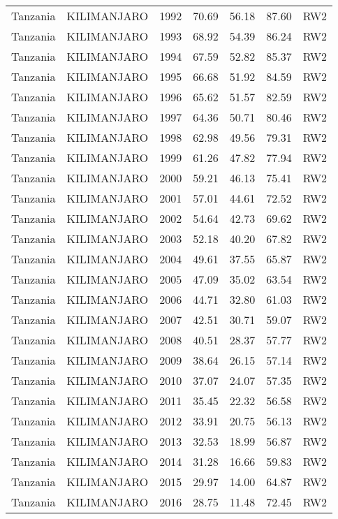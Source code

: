 \begin{longtable}{lllrrrl}
  Tanzania & KILIMANJARO & 1992 & 70.69 & 56.18 & 87.60 & RW2 \\ 
  Tanzania & KILIMANJARO & 1993 & 68.92 & 54.39 & 86.24 & RW2 \\ 
  Tanzania & KILIMANJARO & 1994 & 67.59 & 52.82 & 85.37 & RW2 \\ 
  Tanzania & KILIMANJARO & 1995 & 66.68 & 51.92 & 84.59 & RW2 \\ 
  Tanzania & KILIMANJARO & 1996 & 65.62 & 51.57 & 82.59 & RW2 \\ 
  Tanzania & KILIMANJARO & 1997 & 64.36 & 50.71 & 80.46 & RW2 \\ 
  Tanzania & KILIMANJARO & 1998 & 62.98 & 49.56 & 79.31 & RW2 \\ 
  Tanzania & KILIMANJARO & 1999 & 61.26 & 47.82 & 77.94 & RW2 \\ 
  Tanzania & KILIMANJARO & 2000 & 59.21 & 46.13 & 75.41 & RW2 \\ 
  Tanzania & KILIMANJARO & 2001 & 57.01 & 44.61 & 72.52 & RW2 \\ 
  Tanzania & KILIMANJARO & 2002 & 54.64 & 42.73 & 69.62 & RW2 \\ 
  Tanzania & KILIMANJARO & 2003 & 52.18 & 40.20 & 67.82 & RW2 \\ 
  Tanzania & KILIMANJARO & 2004 & 49.61 & 37.55 & 65.87 & RW2 \\ 
  Tanzania & KILIMANJARO & 2005 & 47.09 & 35.02 & 63.54 & RW2 \\ 
  Tanzania & KILIMANJARO & 2006 & 44.71 & 32.80 & 61.03 & RW2 \\ 
  Tanzania & KILIMANJARO & 2007 & 42.51 & 30.71 & 59.07 & RW2 \\ 
  Tanzania & KILIMANJARO & 2008 & 40.51 & 28.37 & 57.77 & RW2 \\ 
  Tanzania & KILIMANJARO & 2009 & 38.64 & 26.15 & 57.14 & RW2 \\ 
  Tanzania & KILIMANJARO & 2010 & 37.07 & 24.07 & 57.35 & RW2 \\ 
  Tanzania & KILIMANJARO & 2011 & 35.45 & 22.32 & 56.58 & RW2 \\ 
  Tanzania & KILIMANJARO & 2012 & 33.91 & 20.75 & 56.13 & RW2 \\ 
  Tanzania & KILIMANJARO & 2013 & 32.53 & 18.99 & 56.87 & RW2 \\ 
  Tanzania & KILIMANJARO & 2014 & 31.28 & 16.66 & 59.83 & RW2 \\ 
  Tanzania & KILIMANJARO & 2015 & 29.97 & 14.00 & 64.87 & RW2 \\ 
  Tanzania & KILIMANJARO & 2016 & 28.75 & 11.48 & 72.45 & RW2 \\ 

\end{longtable}
